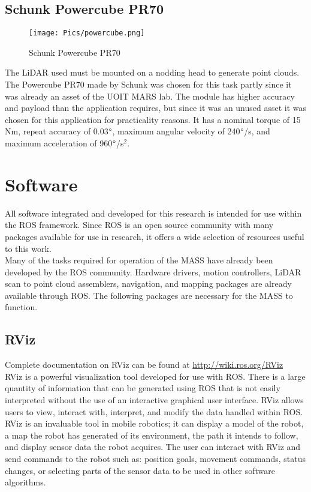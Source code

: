 \subsection{Schunk Powercube PR70}
\begin{figure}[H]
    \centering
    \texttt{[image: Pics/powercube.png]}
    \caption{Schunk Powercube PR70 \cite{schunkpage}}
    \label{fig:schunk}
\end{figure}
The LiDAR used must be mounted on a nodding head to generate point clouds. The Powercube PR70 made by Schunk was chosen for this task partly since it was already an asset of the UOIT MARS lab. The module has higher accuracy and payload than the application requires, but since it was an unused asset it was chosen for this application for practicality reasons. It has a nominal torque of 15 Nm, repeat accuracy of 0.03$\degree$, maximum angular velocity of 240$\degree$/s, and maximum acceleration of 960$\degree$/s$^2$. \\
\section{Software}
\label{sec:software}
All software integrated and developed for this research is intended for use within the ROS framework. Since ROS is an open source community with many packages available for use in research, it offers a wide selection of resources useful to this work.\\

Many of the tasks required for operation of the MASS have already been developed by the ROS community. Hardware drivers, motion controllers, LiDAR scan to point cloud assemblers, navigation, and mapping packages are already available through ROS. The following packages are necessary for the MASS to function.\\
\subsection{RViz}
\label{sec:RViz}

Complete documentation on RViz can be found at \url{http://wiki.ros.org/RViz}\\

RViz is a powerful visualization tool developed for use with ROS. There is a large quantity of information that can be generated using ROS that is not easily interpreted without the use of an interactive graphical user interface. RViz allows users to view, interact with, interpret, and modify the data handled within ROS. RViz is an invaluable tool in mobile robotics; it can display a model of the robot, a map the robot has generated of its environment, the path it intends to follow, and display sensor data the robot acquires. The user can interact with RViz and send commands to the robot such as: position goals, movement commands, status changes, or selecting parts of the sensor data to be used in other software algorithms.\\

